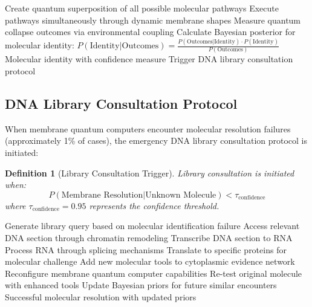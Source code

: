 \documentclass[12pt,a4paper]{article}
\newtheorem{definition}{Definition}
\begin{document}
\begin{algorithm}
\caption{Membrane Quantum Computer Molecular Resolution}
\begin{algorithmic}
    \State Create quantum superposition of all possible molecular pathways
    \State Execute pathways simultaneously through dynamic membrane shapes
    \State Measure quantum collapse outcomes via environmental coupling
    \State Calculate Bayesian posterior for molecular identity:
    \State $P(\text{Identity}|\text{Outcomes}) = \frac{P(\text{Outcomes}|\text{Identity}) \cdot P(\text{Identity})}{P(\text{Outcomes})}$
        \State \Return Molecular identity with confidence measure
    \Else
        \State Trigger DNA library consultation protocol
    \EndIf
\EndProcedure
\end{algorithmic}
\end{algorithm}

\subsection{DNA Library Consultation Protocol}

When membrane quantum computers encounter molecular resolution failures (approximately 1\% of cases), the emergency DNA library consultation protocol is initiated:

\begin{definition}[Library Consultation Trigger]
Library consultation is initiated when:
\begin{equation}
P(\text{Membrane Resolution}|\text{Unknown Molecule}) < \tau_{\text{confidence}}
\end{equation}
where $\tau_{\text{confidence}} = 0.95$ represents the confidence threshold.
\end{definition}

\begin{algorithm}
\caption{DNA Library Emergency Resolution}
\begin{algorithmic}
    \State Generate library query based on molecular identification failure
    \State Access relevant DNA section through chromatin remodeling
    \State Transcribe DNA section to RNA
    \State Process RNA through splicing mechanisms
    \State Translate to specific proteins for molecular challenge
    \State Add new molecular tools to cytoplasmic evidence network
    \State Reconfigure membrane quantum computer capabilities
    \State Re-test original molecule with enhanced tools
    \State Update Bayesian priors for future similar encounters
    \State \Return Successful molecular resolution with updated priors
\EndProcedure
\end{algorithmic}
\end{algorithm}
\end{document}
